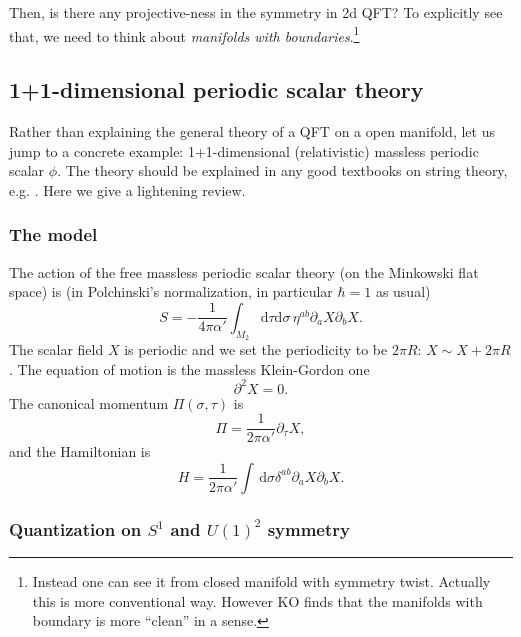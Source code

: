 \documentclass[
]{scrartcl}
\numberwithin{equation}{section}
\theoremstyle{definition}
\theoremstyle{definition}
\theoremstyle{definition}
\theoremstyle{definition}
\theoremstyle{remark}
\begin{document}
Then, is there any projective-ness in the symmetry in 2d QFT?
To explicitly see that, we need to think about \emph{manifolds with boundaries}.\footnote{Instead one can see it from closed manifold with symmetry twist. Actually this is more conventional way. However KO finds that the manifolds with boundary is more ``clean'' in a sense.}

\hypertarget{dimensional-periodic-scalar-theory}{%
\subsection{1+1-dimensional periodic scalar theory}\label{dimensional-periodic-scalar-theory}}

Rather than explaining the general theory of a QFT on a open manifold, let us jump to a concrete example: 1+1-dimensional (relativistic) massless periodic scalar \(\phi\).
The theory should be explained in any good textbooks on string theory, e.g. \textcite{PolchinskiVol1}. Here we give a lightening review.

\hypertarget{the-model}{%
\subsubsection{The model}\label{the-model}}

The action of the free massless periodic scalar theory (on the Minkowski flat space) is (in Polchinski's normalization, in particular \(\hbar =1\) as usual)
\begin{equation}
    \label{eq:SX}
    S = -\frac{1}{4\pi\alpha'}\int_{M_2} \mathrm{d}\tau\mathrm{d}\sigma \,\eta^{ab}\partial_a X \partial_b X.
\end{equation}
The scalar field \(X\) is periodic and we set the periodicity to be \(2\pi R\): \(X \sim X + 2\pi R\).
The equation of motion is the massless Klein-Gordon one
\begin{equation}
    \label{eq:EOMX}
    \partial^2 X = 0.
\end{equation}
The canonical momentum \(\Pi(\sigma,\tau)\) is
\begin{equation}
    \label{eq:momentum}
    \Pi = \frac{1}{2\pi \alpha'} \partial_\tau X,
\end{equation}
and the Hamiltonian is
\begin{equation}
    \label{eq:HamX}
    H = \frac{1}{2\pi\alpha'}\int\, \mathrm{d}\sigma \delta^{ab}\partial_a X \partial_b X.
\end{equation}

\hypertarget{quantization-on-s1-and-u12-symmetry}{%
\subsubsection{\texorpdfstring{Quantization on \(S^1\) and \(U(1)^2\) symmetry}{Quantization on S\^{}1 and U(1)\^{}2 symmetry}}\label{quantization-on-s1-and-u12-symmetry}}
\end{document}
